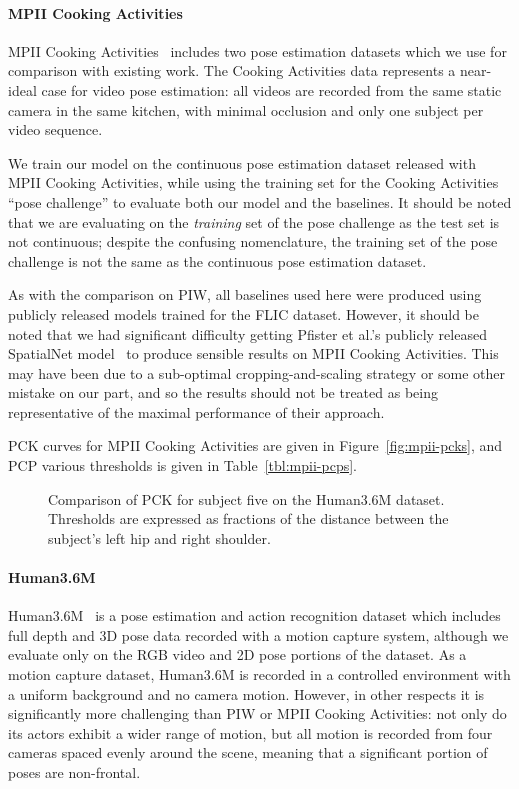 \documentclass[runningheads]{llncs}
\begin{document}
\paragraph{MPII Cooking Activities} MPII Cooking
Activities~\cite{rohrbach2012database} includes two pose estimation datasets
which we use for comparison with existing work. The Cooking Activities data
represents a near-ideal case for video pose estimation: all videos are recorded
from the same static camera in the same kitchen, with minimal occlusion and
only one subject per video sequence.

We train our model on the continuous pose estimation dataset released with MPII
Cooking Activities, while using the training set for the Cooking Activities
``pose challenge'' to evaluate both our model and the baselines. It should be
noted that we are evaluating on the \textit{training} set of the pose challenge
as the test set is not continuous; despite the confusing nomenclature, the
training set of the pose challenge is not the same as the continuous pose
estimation dataset.

As with the comparison on PIW, all baselines used here were produced using
publicly released models trained for the FLIC dataset. However, it should be
noted that we had significant difficulty getting Pfister et al.'s publicly
released SpatialNet model~\cite{pfister2015flowing} to produce sensible results
on MPII Cooking Activities. This may have been due to a sub-optimal
cropping-and-scaling strategy or some other mistake on our part, and so the
results should not be treated as being representative of the maximal performance
of their approach.

PCK curves for MPII Cooking Activities are given in Figure~\ref{fig:mpii-pcks},
and PCP various thresholds is given in Table~\ref{tbl:mpii-pcps}.

\begin{figure}[t]
\begin{center}

\end{center}
\vspace{-8mm}
\caption{Comparison of PCK for subject five on the Human3.6M dataset. Thresholds
are expressed as fractions of the distance between the subject's left hip and
right shoulder.}
\label{fig:h36m-pck}
\end{figure}

\paragraph{Human3.6M} Human3.6M~\cite{ionescu2014human,ionescu2011latent} is a
pose estimation and action recognition dataset which includes full depth and 3D
pose data recorded with a motion capture system, although we evaluate only on
the RGB video and 2D pose portions of the dataset. As a motion capture dataset,
Human3.6M is recorded in a controlled environment with a uniform background and
no camera motion. However, in other respects it is significantly more
challenging than PIW or MPII Cooking Activities: not only do its actors exhibit
a wider range of motion, but all motion is recorded from four cameras spaced
evenly around the scene, meaning that a significant portion of poses are
non-frontal.
\end{document}
